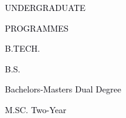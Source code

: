 \documentclass[12pt]{article}
\begin{document}
\begin{Center}
{\fontsize{36pt}{43.2pt}\selectfont \textcolor[HTML]{00000A}{UNDERGRADUATE}\par}
\end{Center}\par


\vspace{\baselineskip}
\begin{Center}
{\fontsize{36pt}{43.2pt}\selectfont \textcolor[HTML]{00000A}{PROGRAMMES}\par}
\end{Center}\par


\vspace{\baselineskip}

\vspace{\baselineskip}

\vspace{\baselineskip}

\vspace{\baselineskip}

\vspace{\baselineskip}
\begin{Center}
{\fontsize{20pt}{24.0pt}\selectfont \textcolor[HTML]{00000A}{B.TECH.}\par}
\end{Center}\par


\vspace{\baselineskip}
\begin{Center}
{\fontsize{20pt}{24.0pt}\selectfont \textcolor[HTML]{00000A}{B.S.}\par}
\end{Center}\par


\vspace{\baselineskip}
\begin{Center}
{\fontsize{20pt}{24.0pt}\selectfont \textcolor[HTML]{00000A}{Bachelors-Masters Dual Degree}\par}
\end{Center}\par


\vspace{\baselineskip}
\begin{Center}
{\fontsize{20pt}{24.0pt}\selectfont \textcolor[HTML]{00000A}{M.SC. Two-Year}\par}
\end{Center}\par
\end{document}
